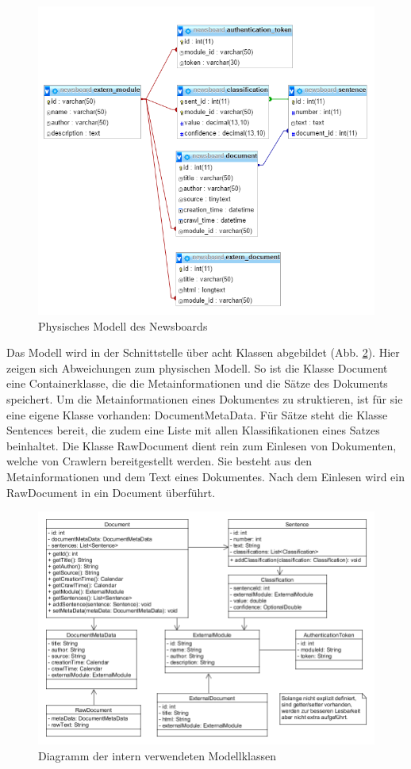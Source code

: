 \begin{figure}[h]
	\centering
	\includegraphics[scale=0.8]{content/physical-model.png}
	\caption{Physisches Modell des Newsboards}
	\label{fig:physical_model}
\end{figure}

Das Modell wird in der Schnittstelle über acht Klassen abgebildet (Abb. 
\ref{fig:uml_model}). Hier zeigen sich Abweichungen zum physischen Modell. So ist die Klasse
Document eine Containerklasse, die die Metainformationen und die Sätze des Dokuments
speichert. Um die Metainformationen eines Dokumentes zu struktieren, ist für sie eine eigene
Klasse vorhanden: DocumentMetaData. Für Sätze steht die Klasse Sentences bereit, die zudem
eine Liste mit allen Klassifikationen eines Satzes beinhaltet. Die  Klasse RawDocument dient
rein zum Einlesen von Dokumenten, welche von Crawlern bereitgestellt werden. Sie besteht aus
den Metainformationen und dem Text eines Dokumentes. Nach dem Einlesen wird ein RawDocument
in ein Document überführt.

\begin{figure}[h]
	\centering
	\includegraphics[scale=0.5]{content/uml-model.png}
	\caption{Diagramm der intern verwendeten Modellklassen}
	\label{fig:uml_model}
\end{figure}

